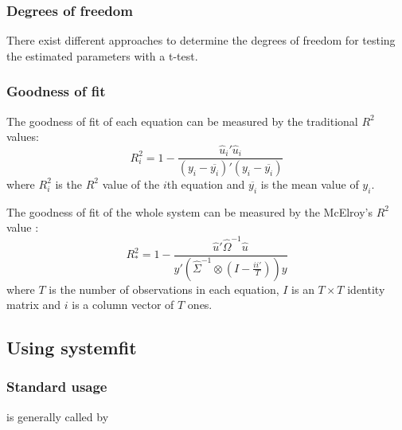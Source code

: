 \documentclass[article]{jss}
\begin{document}
\subsubsection{Degrees of freedom}

There exist different approaches to determine the degrees of
freedom for testing the estimated parameters with a t-test.


\subsubsection{Goodness of fit}

The goodness of fit of each equation can be measured by the 
traditional $R^2$ values:
\begin{equation}
   R_i^2 = 1 - \frac{ \widehat{u}_i' \widehat{u}_i }
   { ( y_i - \overline{y_i} )' ( y_i - \overline{y_i} ) }
\end{equation}
where $R_i^2$ is the $R^2$ value of the $i$th equation
and $\overline{y_i}$ is the mean value of $y_i$.

The goodness of fit of the whole system can be measured by the
McElroy's $R^2$ value \citep{mcelroy77}: 
\begin{equation}
   R_*^2 = 1 - \frac{ \widehat{u}' \widehat{ \Omega }^{-1} \widehat{u} }
   { y' \left( \widehat{ \Sigma }^{-1} \otimes
   \left( I - \frac{i i'}{T} \right) \right) y }
\end{equation}
where $T$ is the number of observations in each equation,
$I$ is an $T \times T$ identity matrix and 
$i$ is a column vector of $T$ ones.




\subsection{Using systemfit}\label{sec:UsingSystemfit}


\subsubsection{Standard usage}

 is generally called by

\end{document}
